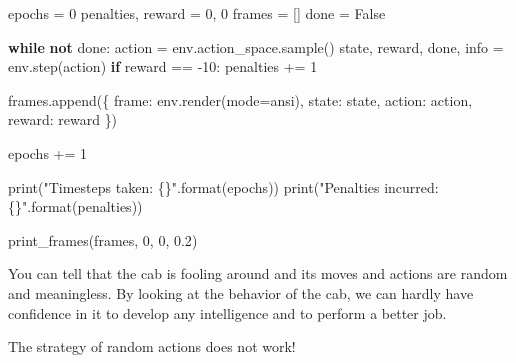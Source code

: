 \documentclass[
  letterpaper,
]{scrbook}
\newenvironment{Shaded}{\begin{snugshade}}{\end{snugshade}}
\newcommand{\BuiltInTok}[1]{\textcolor[rgb]{0.00,0.23,0.31}{#1}}
\newcommand{\ControlFlowTok}[1]{\textcolor[rgb]{0.00,0.23,0.31}{\textbf{#1}}}
\newcommand{\DecValTok}[1]{\textcolor[rgb]{0.68,0.00,0.00}{#1}}
\newcommand{\FloatTok}[1]{\textcolor[rgb]{0.68,0.00,0.00}{#1}}
\newcommand{\KeywordTok}[1]{\textcolor[rgb]{0.00,0.23,0.31}{\textbf{#1}}}
\newcommand{\NormalTok}[1]{\textcolor[rgb]{0.00,0.23,0.31}{#1}}
\newcommand{\OperatorTok}[1]{\textcolor[rgb]{0.37,0.37,0.37}{#1}}
\newcommand{\SpecialCharTok}[1]{\textcolor[rgb]{0.37,0.37,0.37}{#1}}
\newcommand{\StringTok}[1]{\textcolor[rgb]{0.13,0.47,0.30}{#1}}
\newcommand{\VariableTok}[1]{\textcolor[rgb]{0.07,0.07,0.07}{#1}}
\begin{document}
\begin{Shaded}
\begin{Highlighting}[]
\NormalTok{epochs }\OperatorTok{=} \DecValTok{0}
\NormalTok{penalties, reward }\OperatorTok{=} \DecValTok{0}\NormalTok{, }\DecValTok{0}
\NormalTok{frames }\OperatorTok{=}\NormalTok{ []}
\NormalTok{done }\OperatorTok{=} \VariableTok{False}

\ControlFlowTok{while} \KeywordTok{not}\NormalTok{ done: }
\NormalTok{    action }\OperatorTok{=}\NormalTok{ env.action\_space.sample()}
\NormalTok{    state, reward, done, info }\OperatorTok{=}\NormalTok{ env.step(action)}
    \ControlFlowTok{if}\NormalTok{ reward }\OperatorTok{==} \OperatorTok{{-}}\DecValTok{10}\NormalTok{: }
\NormalTok{        penalties }\OperatorTok{+=} \DecValTok{1}
        
\NormalTok{    frames.append(\{}
        \StringTok{\textquotesingle{}frame\textquotesingle{}}\NormalTok{: env.render(mode}\OperatorTok{=}\StringTok{\textquotesingle{}ansi\textquotesingle{}}\NormalTok{), }
        \StringTok{\textquotesingle{}state\textquotesingle{}}\NormalTok{: state, }
        \StringTok{\textquotesingle{}action\textquotesingle{}}\NormalTok{: action, }
        \StringTok{\textquotesingle{}reward\textquotesingle{}}\NormalTok{: reward}
\NormalTok{    \})}
    
\NormalTok{    epochs }\OperatorTok{+=} \DecValTok{1}

\BuiltInTok{print}\NormalTok{(}\StringTok{"Timesteps taken: }\SpecialCharTok{\{\}}\StringTok{"}\NormalTok{.}\BuiltInTok{format}\NormalTok{(epochs))}
\BuiltInTok{print}\NormalTok{(}\StringTok{"Penalties incurred: }\SpecialCharTok{\{\}}\StringTok{"}\NormalTok{.}\BuiltInTok{format}\NormalTok{(penalties))}
\end{Highlighting}
\end{Shaded}

\begin{Shaded}
\begin{Highlighting}[]
\NormalTok{print\_frames(frames, }\DecValTok{0}\NormalTok{, }\DecValTok{0}\NormalTok{, }\FloatTok{0.2}\NormalTok{)}
\end{Highlighting}
\end{Shaded}

You can tell that the cab is fooling around and its moves and actions
are random and meaningless. By looking at the behavior of the cab, we
can hardly have confidence in it to develop any intelligence and to
perform a better job.

The strategy of random actions does not work!
\end{document}

